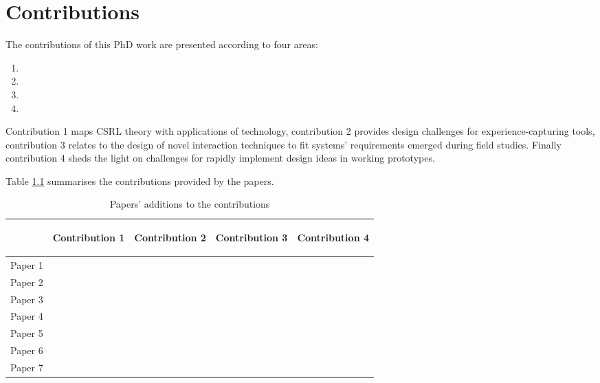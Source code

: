 \chapter{Contributions}\label{contributions}


The contributions of this PhD work are presented according to four areas:

\begin{enumerate}
	\def\labelenumi{\arabic{enumi}.} 
	\itemsep1pt\parskip0pt 
	\item \Ci 
	\item \Cii 
	\item \Ciii 
	\item \Civ
\end{enumerate}

Contribution 1 maps CSRL theory with applications of technology, contribution 2 provides design challenges for experience-capturing tools, contribution 3 relates to the design of novel interaction techniques to fit systems' requirements emerged during field studies. Finally contribution 4 sheds the light on challenges for rapidly implement design ideas in working prototypes.

Table \ref{tab:papers-and-contributions} summarises the contributions provided by the papers.

\begin{table}[tbh] 
	\centering 
	\caption{Papers' additions to the contributions} 
	\label{tab:papers-and-contributions} 
	\smallskip
	\begin{tabular}{@{}lcccc@{}}
	\toprule
	  & \begin{turn}{90}Contribution 1\end{turn} & \begin{turn}{90}Contribution 2\end{turn} & \begin{turn}{90}Contribution 3\end{turn} & \begin{turn}{90}Contribution 4\end{turn} \\
	\midrule
	Paper 1 & & & \textbullet & \\
	Paper 2 & \textbullet & \textbullet & & \\
	Paper 3 & & \textbullet & \textbullet & \textbullet \\
	Paper 4 & \textbullet & & & \\
	Paper 5 & & & \textbullet & \textbullet \\
	Paper 6 & \textbullet & & & \\
	Paper 7 & & & & \textbullet \\
	\bottomrule 
	\end{tabular}
\end{table}

